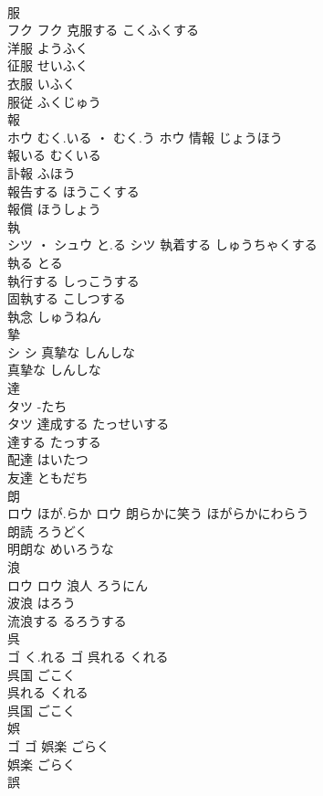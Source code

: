\documentclass[8pt]{extreport}
\begin{document}
\begin{CJK}{UTF8}{min}
\\	服	
\\	フク		フク	克服する	こくふくする	
\\	洋服	ようふく	
\\	征服	せいふく	
\\	衣服	いふく	
\\	服従	ふくじゅう	
\\	報	
\\	ホウ	むく.いる ・ むく.う	ホウ	情報	じょうほう	
\\	報いる	むくいる	
\\	訃報	ふほう	
\\	報告する	ほうこくする	
\\	報償	ほうしょう	
\\	執	
\\	シツ ・ シュウ	と.る	シツ	執着する	しゅうちゃくする	
\\	執る	とる	
\\	執行する	しっこうする	
\\	固執する	こしつする	
\\	執念	しゅうねん	
\\	摯	
\\	シ		シ	真摯な	しんしな	
\\	真摯な	しんしな	
\\	達	
\\	タツ	-たち
\\	タツ	達成する	たっせいする	
\\	達する	たっする	
\\	配達	はいたつ	
\\	友達	ともだち	
\\	朗	
\\	ロウ	ほが.らか	ロウ	朗らかに笑う	ほがらかにわらう	
\\	朗読	ろうどく	
\\	明朗な	めいろうな	
\\	浪	
\\	ロウ		ロウ	浪人	ろうにん	
\\	波浪	はろう	
\\	流浪する	るろうする	
\\	呉	
\\	ゴ	く.れる	ゴ	呉れる	くれる	
\\	呉国	ごこく	
\\	呉れる	くれる	
\\	呉国	ごこく	
\\	娯	
\\	ゴ		ゴ	娯楽	ごらく	
\\	娯楽	ごらく	
\\	誤	

\end{CJK}
\end{document}
